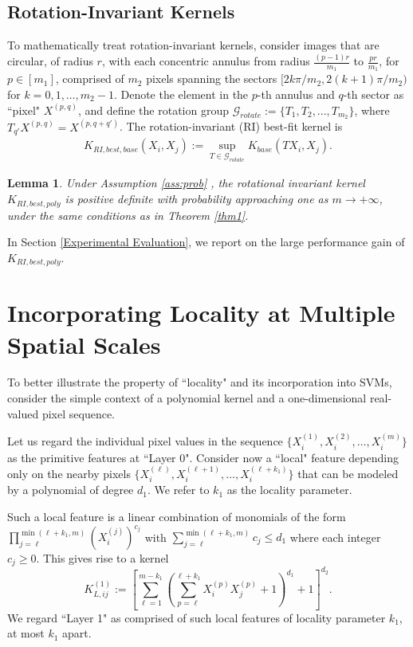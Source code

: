 \documentclass{article}
\theoremstyle{plain}
\newtheorem{lemma}{Lemma}
\theoremstyle{definition}
\theoremstyle{remark}
\begin{document}
\subsection{Rotation-Invariant Kernels}
To mathematically treat rotation-invariant kernels, consider images that are circular, of radius $r$, with each concentric annulus from radius $\frac{(p-1) r}{m_1}$ to $\frac{p r}{m_1}$, for $p \in [m_1]$, comprised of $m_2$ pixels spanning the sectors $[2k \pi/m_2, 2(k+1)\pi/m_2)$ for $k=0, 1, \ldots, m_2-1$. Denote the element in the $p$-th annulus and $q$-th sector as ``pixel" $X^{(p,q)}$, and define the rotation group $\mathcal{G}_{rotate} := \{T_1, T_2, ... , T_{m_2}\}$, where $T_{q'} X^{(p,q)} = X^{(p,q+q')}$. The rotation-invariant (RI) best-fit kernel is
\begin{align*}
    K_{RI,best,base} (X_i, X_j) := \sup_{T \in \mathcal{G}_{rotate}} K_{base}(T X_i, X_j).
\end{align*}

\begin{lemma}
    Under Assumption \ref{ass:prob} ,
    the rotational invariant kernel $K_{RI,best,poly}$ is positive definite with probability approaching one as $m \to +\infty$, under the same conditions as in Theorem \ref{thm1}. 
\label{lem:RI}
\end{lemma}

In Section \ref{Experimental Evaluation}, we report on the large performance gain of $K_{RI,best,poly}$. 



\section{Incorporating Locality at Multiple Spatial Scales}
To better illustrate the property of ``locality" and its incorporation into SVMs, consider the simple context of a polynomial kernel and a one-dimensional real-valued pixel sequence.

Let us regard the individual pixel values in the sequence $\{X_{i}^{(1)}, X_{i}^{(2)}, \ldots , X_{i}^{(m)} \}$ as the primitive features at ``Layer 0". Consider now a ``local" feature depending only on the nearby pixels $\{X_{i}^{(\ell)}, X_{i}^{(\ell+1)}, \ldots , X_{i}^{(\ell+k_1)} \}$ that can be modeled by a polynomial of degree $d_1$. We refer to $k_1$ as the locality parameter.

Such a local feature is a linear combination of monomials of the form $\prod_{j=\ell}^{\min(\ell+k_1,m)} (X_{i}^{(j)})^{c_j}$ with $\sum_{j=\ell}^{\min(\ell+k_1,m)} c_j \leq d_1$ where each integer $c_{j} \geq 0$. This gives rise to a kernel
\begin{equation}
\label{basic locality}
    K_{L, ij}^{(1)} := [\sum_{\ell=1}^{m-k_1}(\sum_{p=\ell}^{\ell+k_1} X_{i}^{(p)} X_{j}^{(p)} + 1)^{d_1}+1]^{d_2}.
\end{equation}
We regard ``Layer 1" as comprised of such local features of locality parameter $k_1$, at most $k_1$ apart.
\end{document}
